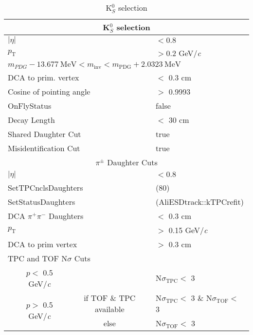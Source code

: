 \documentclass[ALICE,manyauthors]{cernphprep}
\begin{document}
\begin{table}[htbp]
 \centering
  \begin{tabular}{lc|c|l}
   \hline  
   \multicolumn{4}{c}{K$^{0}_{S}$ selection} \\
   \hline
   \multicolumn{3}{l|}{$|\eta|$} & $< 0.8$ \\
   \hline
   \multicolumn{3}{l|}{$p_{\mathrm{T}}$} & $> 0.2$ GeV/\textit{c} \\
   \hline
   \multicolumn{4}{l|}{$m_{PDG}-13.677 \ \mathrm{MeV} < m_{\mathrm{inv}} < m_{\mathrm{PDG}} + 2.0323 \ \mathrm{MeV}$} \\ 
   \hline
   \multicolumn{3}{l|}{DCA to prim. vertex} & $<$ 0.3 cm \\
   \hline
   \multicolumn{3}{l|}{Cosine of pointing angle} & $>$ 0.9993 \\
   \hline
   \multicolumn{3}{l|}{OnFlyStatus} & false \\
   \hline
   \multicolumn{3}{l|}{Decay Length} & $<$ 30 cm \\
   \hline
   \multicolumn{3}{l|}{Shared Daughter Cut} & true \\
   \hline
   \multicolumn{3}{l|}{Misidentification Cut} & true \\
   \hline   
      
   
   \multicolumn{4}{c}{$\pi^{\pm}$ Daughter Cuts} \\
   \hline
   \multicolumn{3}{l|}{$|\eta|$} &  $< 0.8$ \\
   \hline
   \multicolumn{3}{l|}{SetTPCnclsDaughters} & (80) \\
   \hline
   \multicolumn{3}{l|}{SetStatusDaughters} & (AliESDtrack::kTPCrefit) \\
   \hline
   \multicolumn{3}{l|}{DCA $\pi^{+}\pi^{-}$ Daughters} & $<$ 0.3 cm \\
   \hline
   \multicolumn{3}{l|}{$p_{\mathrm{T}}$} & $>$ 0.15 GeV/\textit{c} \\
   \hline
   \multicolumn{3}{l|}{DCA to prim vertex} & $>$ 0.3 cm \\
   \hline
   \multicolumn{4}{l}{TPC and TOF N$\sigma$ Cuts} \\
   \hline
    & \multicolumn{1}{c}{$p <$ 0.5 GeV/\textit{c}} &  & N$\sigma_{\mathrm{TPC}} <$ 3 \\
   \hline
    & \multirow{2}{*}{$p >$ 0.5 GeV/\textit{c}} &  if TOF \& TPC available & N$\sigma_{\mathrm{TPC}} <$ 3 \& N$\sigma_{\mathrm{TOF}} <$ 3 \\
   \cline{3-4}
    & & else & N$\sigma_{\mathrm{TOF}} <$ 3 \\
   \hline   
  \end{tabular}
 \caption{K$^{0}_{S}$ selection}
 \label{tab:K0sCuts} 
\end{table}
\end{document}

